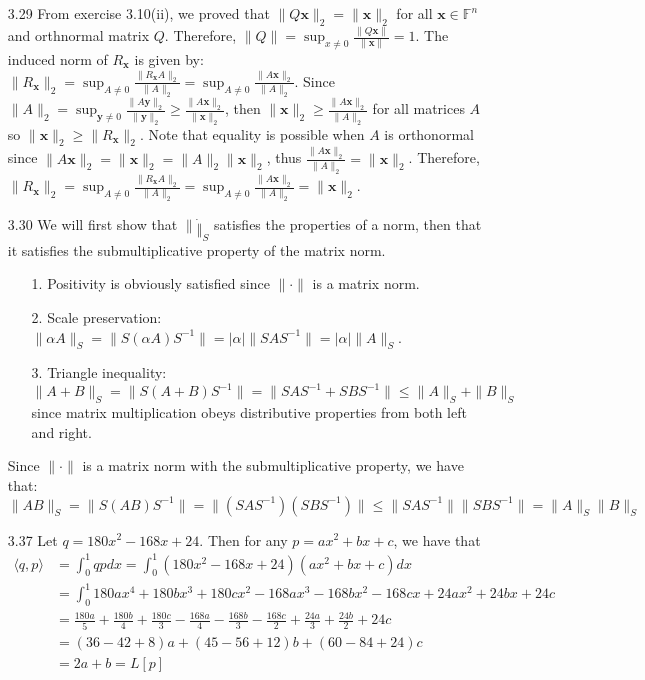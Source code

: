 \documentclass[letterpaper,12pt]{article}
\theoremstyle{definition}
\begin{document}
\begin{enumerate}
        \item[3.29]
        From exercise 3.10(ii), we proved that $\|Q\mathbf{x}\|_2 = \|\mathbf{x}\|_2$ for all $\mathbf{x} \in \mathbb{F}^n$ and orthnormal matrix $Q$. Therefore, $\|Q\| = \sup_{x\neq0}\frac{\|Q\mathbf{x}\|}{\|\mathbf{x}\|} = 1$.
        The induced norm of $R_{\mathbf{x}}$ is given by: $\|R_{\mathbf{x}}\|_2 = \sup_{A\neq0} \frac{\|R_{\mathbf{x}}A\|_2}{\|A\|_2} = \sup_{A\neq0}\frac{\|A\mathbf{x}\|_2}{\|A\|_2}$. Since $\|A\|_2 = \sup_{\mathbf{y}\neq0} \frac{\|A\mathbf{y}\|_2}{\|\mathbf{y}\|_2} \geq \frac{\|A\mathbf{x}\|_2}{\|\mathbf{x}\|_2} $, then $\|\mathbf{x}\|_2 \geq \frac{\|A\mathbf{x}\|_2}{\|A\|_2}$ for all matrices $A$ so $\|\mathbf{x}\|_2 \geq \|R_{\mathbf{x}}\|_2$. Note that equality is possible when $A$ is orthonormal since $\|A\mathbf{x}\|_2 = \|\mathbf{x}\|_2 = \|A\|_2 \|\mathbf{x}\|_2$, thus $\frac{\|A\mathbf{x}\|_2}{\|A\|_2} = \|\mathbf{x}\|_2$. Therefore, $\|R_{\mathbf{x}}\|_2 = \sup_{A\neq0} \frac{\|R_{\mathbf{x}}A\|_2}{\|A\|_2} = \sup_{A\neq0}\frac{\|A\mathbf{x}\|_2}{\|A\|_2} = \|\mathbf{x}\|_2$.

        \item[3.30]
        We will first show that $\|\dot\|_S$ satisfies the properties of a norm, then that it satisfies the submultiplicative property of the matrix norm.
          \begin{enumerate}
            \item[1.] Positivity is obviously satisfied since $\|\cdot\|$ is a matrix norm.
            \item[2.] Scale preservation: $\|\alpha A\|_S = \|S(\alpha A)S^{-1}\| = |\alpha| \|SAS^{-1}\| = |\alpha|\|A\|_S$.
            \item[3.] Triangle inequality: $\|A + B\|_S = \|S(A+B)S^{-1}\| = \|SAS^{-1} + SBS^{-1}\| \leq \|A\|_S + \|B\|_S$ since matrix multiplication obeys distributive properties from both left and right.
          \end{enumerate}
        Since $\|\cdot\|$ is a matrix norm with the submultiplicative property, we have that:
          \begin{equation*}
            \|AB\|_S = \|S(AB)S^{-1}\| = \|(SAS^{-1})(SBS^{-1})\| \leq \|SAS^{-1}\|\|SBS^{-1}\| =\|A\|_S\|B\|_S
          \end{equation*}

        \item[3.37]
        Let $q = 180x^2-168x+24$. Then for any $p = ax^2 + bx +c$, we have that
        \begin{align*}
          \langle q, p \rangle &= \int_0^1 qp dx = \int_0^1 (180x^2-168x+24)(ax^2 + bx +c) dx \\
          &= \int_0^1 180ax^4 + 180bx^3 + 180cx^2 - 168ax^3 - 168bx^2 - 168cx + 24ax^2 + 24bx + 24c \\
          &= \frac{180a}{5} + \frac{180b}{4} + \frac{180c}{3} - \frac{168a}{4} - \frac{168b}{3} - \frac{168c}{2} + \frac{24a}{3} + \frac{24b}{2} + 24c \\
          &= (36 - 42 + 8)a + (45 - 56 + 12)b + (60-84+24)c \\
          &= 2a+b = L[p]
        \end{align*}


\end{enumerate}
\end{document}
